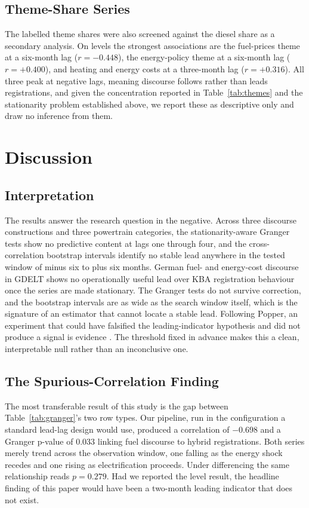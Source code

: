 \documentclass[conference]{IEEEtran}
\begin{document}
\subsection{Theme-Share Series}
The labelled theme shares were also screened against the diesel share as a
secondary analysis. On levels the strongest associations are the fuel-prices
theme at a six-month lag ($r=-0.448$), the energy-policy theme at a six-month
lag ($r=+0.400$), and heating and energy costs at a three-month lag
($r=+0.316$). All three peak at negative lags, meaning discourse follows rather
than leads registrations, and given the concentration reported in
Table~\ref{tab:themes} and the stationarity problem established above, we report
these as descriptive only and draw no inference from them.

\section{Discussion}
\subsection{Interpretation}
The results answer the research question in the negative. Across three discourse
constructions and three powertrain categories, the stationarity-aware Granger
tests show no predictive content at lags one through four, and the
cross-correlation bootstrap intervals identify no stable lead anywhere in the
tested window of minus six to plus six months. German fuel- and energy-cost
discourse in GDELT shows no operationally useful lead over KBA registration
behaviour once the series are made stationary. The Granger
tests do not survive correction, and the bootstrap intervals are as wide as the
search window itself, which is the signature of an estimator that cannot locate
a stable lead. Following Popper, an experiment that could have falsified the
leading-indicator hypothesis and did not produce a signal is evidence
\cite{popper1959}. The threshold fixed in advance makes this a clean,
interpretable null rather than an inconclusive one.

\subsection{The Spurious-Correlation Finding}
The most transferable result of this study is the gap between
Table~\ref{tab:granger}'s two row types. Our pipeline, run in the configuration
a standard lead-lag design would use, produced a correlation of $-0.698$ and a
Granger p-value of 0.033 linking fuel discourse to hybrid registrations. Both
series merely trend across the observation window, one falling as the energy
shock recedes and one rising as electrification proceeds. Under differencing the
same relationship reads $p=0.279$. Had we reported the level result, the
headline finding of this paper would have been a two-month leading indicator
that does not exist.
\end{document}
